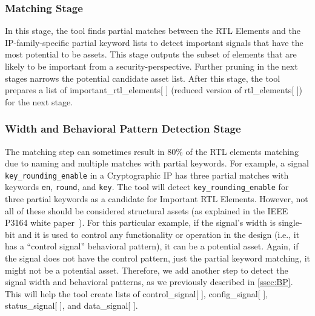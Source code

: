 \subsubsection{Matching Stage}
In this stage, the tool finds partial matches between the RTL Elements and the IP-family-specific partial keyword lists to detect important signals that have the most potential to be assets. 
This stage outputs the subset of elements that are likely to be important from a security-perspective. 
Further pruning in the next stages narrows the potential candidate asset list. 
After this stage, the tool prepares a list of important\_rtl\_elements[ ] (reduced version of rtl\_elements[ ]) for the next stage.

\subsubsection{Width and Behavioral Pattern Detection Stage}
The matching step can sometimes result in 80\% of the RTL elements matching due to naming and multiple matches with partial keywords. 
For example, a signal \texttt{key\_rounding\_enable} in a Cryptographic \ac{IP} has three partial matches with keywords \texttt{en}, \texttt{round}, and \texttt{key}. 
The tool will detect \texttt{key\_rounding\_enable} for three partial keywords as a candidate for Important RTL Elements. 
However, not all of these should be considered structural assets (as explained in the IEEE P3164 white paper~\cite{ieee_p3164_working_group_asset_2024}). 
For this particular example, if the signal's width is single-bit and it is used to control any functionality or operation in the design (i.e., it has a ``control signal'' behavioral pattern), it can be a potential asset. 
Again, if the signal does not have the control pattern, just the partial keyword matching, it might not be a potential asset.
Therefore, we add another step to detect the signal width and behavioral patterns, as we previously described in \autoref{ssec:BP}. This will help the tool create lists of control\_signal[ ], config\_signal[ ], status\_signal[ ], and data\_signal[ ]. 

